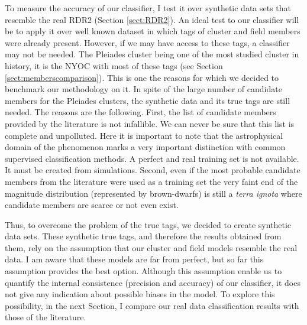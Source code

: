 To measure the accuracy of our classifier, I test it over synthetic data sets that resemble the real RDR2 (Section \ref{sect:RDR2}). An ideal test to our classifier will be to apply it over well known dataset in which tags of cluster and field members were already present. However, if we may have access to these tags, a classifier may not be needed. The Pleiades cluster being one of the most studied cluster in history, it is the NYOC with most of these tags (see Section \ref{sect:memberscomparison}). This is one the reasons for which we decided to benchmark our methodology on it. In spite of the large number of candidate members for the Pleiades clusters, the synthetic data and its true tags are still needed. The reasons are the following. First, the list of candidate members provided by the literature is not infallible. We can never be sure that this list is complete and unpolluted. Here it is important to note that the astrophysical domain of the phenomenon marks a very important distinction with common supervised classification methods. A perfect and real training set is not available. It must be created from simulations. Second, even if the most probable candidate members from the literature were used as a training set \cite[as done for example by][]{Sarro2014} the very faint end of the magnitude distribution (represented by brown-dwarfs) is still a \emph{terra ignota} where candidate members are scarce or not even exist. 

Thus, to overcome the problem of the true tags, we decided to create synthetic data sets. These synthetic true tags, and therefore the results obtained from them, rely on the assumption that our cluster and field models resemble the real data. I am aware that these models are far from perfect, but so far this assumption provides the best option. Although this assumption enable us to quantify the internal consistence (precision and accuracy) of our classifier, it does not give any indication about possible biases in the model. To explore this possibility, in the next Section, I compare our real data classification results with those of the literature.

